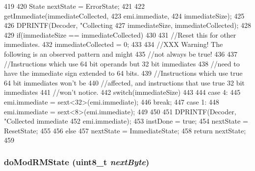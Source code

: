 \begin{DoxyCode}
419 {
420     State nextState = ErrorState;
421 
422     getImmediate(immediateCollected,
423             emi.immediate,
424             immediateSize);
425 
426     DPRINTF(Decoder, "Collecting %
427             immediateSize, immediateCollected);
428 
429     if(immediateSize == immediateCollected)
430     {
431         //Reset this for other immediates.
432         immediateCollected = 0;
433 
434         //XXX Warning! The following is an observed pattern and might
435         //not always be true!
436 
437         //Instructions which use 64 bit operands but 32 bit immediates
438         //need to have the immediate sign extended to 64 bits.
439         //Instructions which use true 64 bit immediates won't be
440         //affected, and instructions that use true 32 bit immediates
441         //won't notice.
442         switch(immediateSize)
443         {
444           case 4:
445             emi.immediate = sext<32>(emi.immediate);
446             break;
447           case 1:
448             emi.immediate = sext<8>(emi.immediate);
449         }
450 
451         DPRINTF(Decoder, "Collected immediate %
452                 emi.immediate);
453         instDone = true;
454         nextState = ResetState;
455     }
456     else
457         nextState = ImmediateState;
458     return nextState;
459 }
\end{DoxyCode}
\hypertarget{classX86ISA_1_1Decoder_af92cd28d02e33555be9f257fa37e988b}{
\subsubsection[{doModRMState}]{ doModRMState (uint8\_\-t {\em nextByte})}}
\label{classX86ISA_1_1Decoder_af92cd28d02e33555be9f257fa37e988b}



